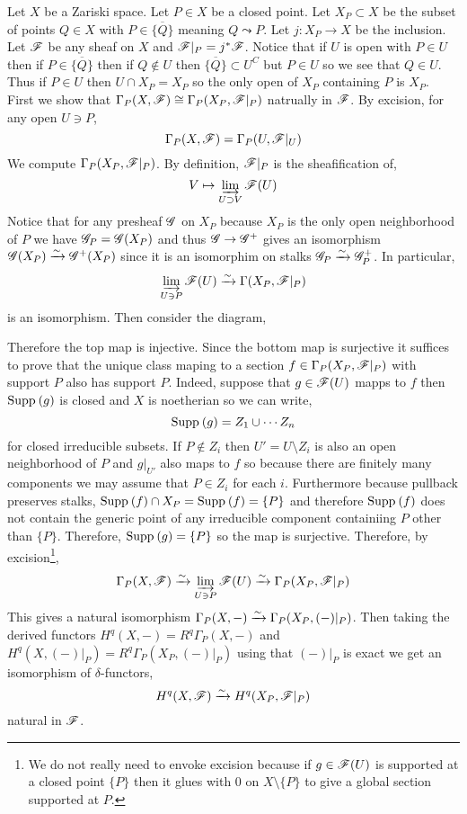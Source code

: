 \documentclass[12pt]{article}
\begin{document}
Let $X$ be a Zariski space. Let $P \in X$ be a closed point. Let $X_P \subset X$ be the subset of points $Q \in X$ with $P \in \overline{\{Q\}}$ meaning $Q \leadsto P$. Let $j : X_P \to X$ be the inclusion. Let $\mathscr{F}$ be any sheaf on $X$ and $\mathscr{F}|_P = j^* \mathscr{F}$. Notice that if $U$ is open with $P \in U$ then if $P \in \overline{ \{ Q \} }$ then if $Q \notin U$ then $\overline{ \{ Q \} } \subset U^C$ but $P \in U$ so we see that $Q \in U$. Thus if $P \in U$ then $U \cap X_P = X_P$ so the only open of $X_P$ containing $P$ is $X_P$. 
\bigskip\\
First we show that $\Gamma_P(X, \mathscr{F}) \cong \Gamma_P(X_P, \mathscr{F}|_P)$ natrually in $\mathscr{F}$. By excision, for any open $U \ni P$,
\[ \Gamma_P(X, \mathscr{F}) = \Gamma_P(U, \mathscr{F}|_U) \]
We compute $\Gamma_P(X_P, \mathscr{F}|_P)$. By definition, $\mathscr{F}|_P$ is the sheafification of,
\[ V \mapsto \varinjlim_{U \supset V} \mathscr{F}(U) \]
Notice that for any presheaf $\mathscr{G}$ on $X_P$ because $X_P$ is the only open neighborhood of $P$ we have $\mathscr{G}_P = \mathscr{G}(X_P)$ and thus $\mathscr{G} \to \mathscr{G}^+$ gives an isomorphism $\mathscr{G}(X_P) \xrightarrow{\sim} \mathscr{G}^+(X_P)$ since it is an isomorphim on stalks $\mathscr{G}_P \xrightarrow{\sim} \mathscr{G}^+_P$. In particular, 
\[ \varinjlim_{U \ni P} \mathscr{F}(U) \xrightarrow{\sim} \Gamma(X_P, \mathscr{F}|_P) \]
is an isomorphism. Then consider the diagram,
\begin{center}
\end{center}
Therefore the top map is injective. Since the bottom map is surjective it suffices to prove that the unique class maping to a section $f \in \Gamma_P(X_P, \mathscr{F}|_P)$ with support $P$ also has support $P$. Indeed, suppose that $g \in \mathscr{F}(U)$ mapps to $f$ then $\mathrm{Supp}_{} \left( g \right)$ is closed and $X$ is noetherian so we can write,
\[ \mathrm{Supp}_{} \left( g \right) = Z_1 \cup \cdots Z_n \]
for closed irreducible subsets. If $P \notin Z_i$ then $U' = U \setminus Z_i$ is also an open neighborhood of $P$ and $g|_{U'}$ also maps to $f$ so because there are finitely many components we may assume that $P \in Z_i$ for each $i$. Furthermore because pullback preserves stalks, $\mathrm{Supp}_{} \left( f \right) \cap X_P = \mathrm{Supp}_{} \left( f \right) = \{ P \}$ and therefore $\mathrm{Supp}_{} \left( f \right)$ does not contain the generic point of any irreducible component containiing $P$ other than $\{ P \}$. Therefore, $\mathrm{Supp}_{} \left( g \right) = \{ P \}$ so the map is surjective. Therefore, by excision\footnote{We do not really need to envoke excision because if $g \in \mathscr{F}(U)$ is supported at a closed point $\{ P \}$ then it glues with $0$ on $X \setminus \{ P \}$ to give a global section supported at $P$.},
\[ \Gamma_P(X, \mathscr{F}) \xrightarrow{\sim} \varinjlim_{U \ni P} \mathscr{F}(U) \xrightarrow{\sim} \Gamma_P(X_P, \mathscr{F}|_P) \]
This gives a natural isomorphism $\Gamma_P(X,-) \xrightarrow{\sim} \Gamma_P(X_P, (-)|_P)$. Then taking the derived functors $H^q(X, -) = R^q \Gamma_P(X, -)$ and $H^q(X, (-)|_P) = R^q \Gamma_P(X_P, (-)|_P)$ using that $(-)|_P$ is exact we get an isomorphism of $\delta$-functors,
\[ H^q(X, \mathscr{F}) \xrightarrow{\sim} H^q(X_P, \mathscr{F}|_P) \]
natural in $\mathscr{F}$.
\end{document}
